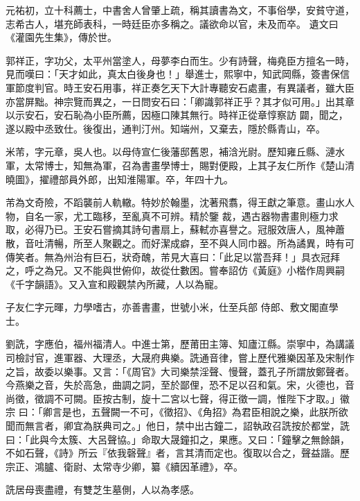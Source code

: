 \begin{pinyinscope}
 元祐初，立十科薦士，中書舍人曾肇上疏，稱其讀書為文，不事俗學，安貧守道，志希古人，堪充師表科，一時廷臣亦多稱之。議欲命以官，未及而卒。
 遺文曰《灌園先生集》，傳於世。



 郭祥正，字功父，太平州當塗人，母夢李白而生。少有詩聲，梅堯臣方擅名一時，見而嘆曰：「天才如此，真太白後身也！」舉進士，熙寧中，知武岡縣，簽書保信軍節度判官。時王安石用事，祥正奏乞天下大計專聽安石處畫，有異議者，雖大臣亦當屏黜。神宗覽而異之，一日問安石曰：「卿識郭祥正乎？其才似可用。」出其章以示安石，安石恥為小臣所薦，因極口陳其無行。時祥正從章惇察訪
 闢，聞之，遂以殿中丞致仕。後復出，通判汀州。知端州，又棄去，隱於縣青山，卒。



 米芾，字元章，吳人也。以母侍宣仁後藩邸舊恩，補浛光尉。歷知雍丘縣、漣水軍，太常博士，知無為軍，召為書畫學博士，賜對便殿，上其子友仁所作《楚山清曉圖》，擢禮部員外郎，出知淮陽軍。卒，年四十九。



 芾為文奇險，不蹈襲前人軌轍。特妙於翰墨，沈著飛翥，得王獻之筆意。畫山水人物，自名一家，尤工臨移，至亂真不可辨。精於鑒
 裁，遇古器物書畫則極力求取，必得乃已。王安石嘗摘其詩句書扇上，蘇軾亦喜譽之。冠服效唐人，風神蕭散，音吐清暢，所至人聚觀之。而好潔成癖，至不與人同巾器。所為譎異，時有可傳笑者。無為州治有巨石，狀奇醜，芾見大喜曰：「此足以當吾拜！」具衣冠拜之，呼之為兄。又不能與世俯仰，故從仕數困。嘗奉詔仿《黃庭》小楷作周興嗣《千字韻語》。又入宣和殿觀禁內所藏，人以為寵。



 子友仁字元暉，力學嗜古，亦善書畫，世號小米，仕至兵部
 侍郎、敷文閣直學士。



 劉詵，字應伯，福州福清人。中進士第，歷莆田主簿、知廬江縣。崇寧中，為講議司檢討官，進軍器、大理丞，大晟府典樂。詵通音律，嘗上歷代雅樂因革及宋制作之旨，故委以樂事。又言：「《周官》大司樂禁淫聲、慢聲，蓋孔子所謂放鄭聲者。今燕樂之音，失於高急，曲調之詞，至於鄙俚，恐不足以召和氣。宋，火德也，音尚徵，徵調不可闕。臣按古制，旋十二宮以七聲，得正徵一調，惟陛下才取。」徽宗
 曰：「卿言是也，五聲闕一不可，《徵招》、《角招》為君臣相說之樂，此朕所欲聞而無言者，卿宜為朕典司之。」他日，禁中出古鐘二，詔執政召詵按於都堂，詵曰：「此與今太簇、大呂聲協。」命取大晟鐘扣之，果應。又曰：「鐘擊之無餘韻，不如石聲，《詩》所云『依我磬聲』者，言其清而定也。復取以合之，聲益諧。歷宗正、鴻臚、衛尉、太常寺少卿，纂《續因革禮》，卒。



 詵居母喪盡禮，有雙芝生墓側，人以為孝感。




\end{pinyinscope}
